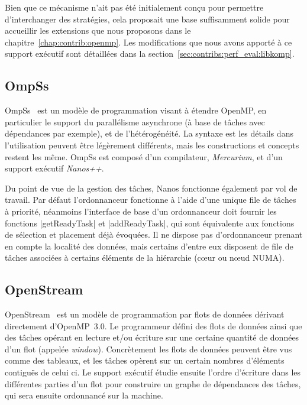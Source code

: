 Bien que ce mécanisme n'ait pas été initialement conçu pour permettre d'interchanger des stratégies, cela proposait une base suffisamment solide pour accueillir les extensions que nous proposons dans le chapitre~\ref{chap:contrib:openmp}.
Les modifications que nous avons apporté à ce support exécutif sont détaillées dans la section~\ref{sec:contribs:perf_eval:libkomp}.


\subsection{OmpSs}\label{subsec:rw:ompss}

OmpSs~\cite{OMPSs} est un modèle de programmation visant à étendre OpenMP, en particulier le support du parallélisme asynchrone (à base de tâches avec dépendances par exemple), et de l'hétérogénéité.
La syntaxe est les détails dans l'utilisation peuvent être légèrement différents, mais les constructions et concepts restent les même.
OmpSs est composé d'un compilateur, \emph{Mercurium}, et d'un support exécutif \emph{Nanos++}.

Du point de vue de la gestion des tâches, Nanos fonctionne également par vol de travail.
Par défaut l'ordonnanceur fonctionne à l'aide d'une unique file de tâches à priorité, néanmoins l'interface de base d'un ordonnanceur doit fournir les fonctions |getReadyTask| et |addReadyTask|, qui sont équivalente aux fonctions de sélection et placement déjà évoquées.
Il ne dispose pas d'ordonnanceur prenant en compte la localité des données, mais certains d'entre eux disposent de file de tâches associées à certains éléments de la hiérarchie (cœur ou nœud NUMA).


\subsection{OpenStream}

OpenStream~\cite{Pop2013} est un modèle de programmation par flots de données dérivant directement d'OpenMP~3.0.
Le programmeur défini des flots de données ainsi que des tâches opérant en lecture et/ou écriture sur une certaine quantité de données d'un flot (appelée \emph{window}).
Concrètement les flots de données peuvent être vus comme des tableaux, et les tâches opèrent sur un certain nombres d'éléments contiguës de celui ci.
Le support exécutif étudie ensuite l'ordre d'écriture dans les différentes parties d'un flot pour construire un graphe de dépendances des tâches, qui sera ensuite ordonnancé sur la machine.

